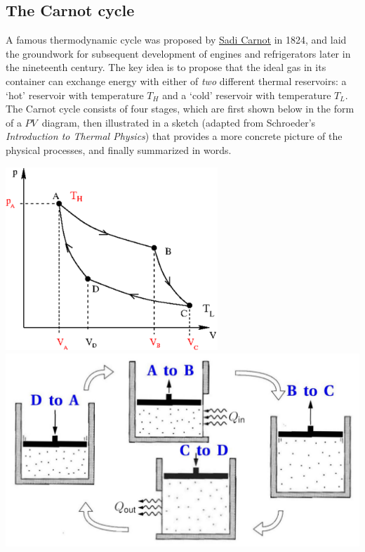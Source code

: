 \subsection{The Carnot cycle}
A famous thermodynamic cycle was proposed by \href{https://en.wikipedia.org/wiki/Nicolas_Leonard_Sadi_Carnot}{Sadi Carnot} in 1824, and laid the groundwork for subsequent development of engines and refrigerators later in the nineteenth century.
The key idea is to propose that the ideal gas in its container can exchange energy with either of \emph{two} different thermal reservoirs: a `hot' reservoir with temperature $T_H$ and a `cold' reservoir with temperature $T_L$.
The Carnot cycle consists of four stages, which are first shown below in the form of a $PV$~diagram, then illustrated in a sketch (adapted from Schroeder's \textit{Introduction to Thermal Physics}) that provides a more concrete picture of the physical processes, and finally summarized in words.

\begin{center}
  \includegraphics[width=0.6\textwidth]{figs/unit05_carnot-PV.pdf} \\[36 pt]
  \includegraphics[width=\textwidth]{figs/unit05_carnot.pdf}
\end{center}

